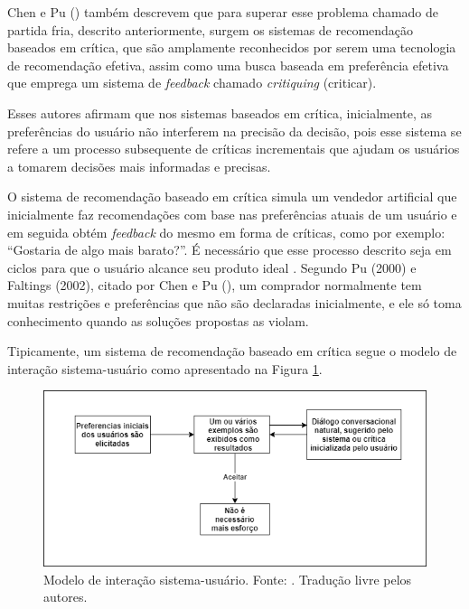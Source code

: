 Chen e Pu (\citeyear{Chen:2012}) também descrevem que para superar esse problema chamado de partida fria, descrito anteriormente, surgem os sistemas de recomendação baseados em crítica, que são amplamente reconhecidos por serem uma tecnologia de recomendação efetiva, assim como uma busca baseada em preferência efetiva que emprega um sistema de \textit{feedback} chamado \textit{critiquing} (criticar).

Esses autores afirmam que nos sistemas baseados em crítica, inicialmente, as preferências do usuário não interferem na precisão da decisão, pois esse sistema se refere a um processo subsequente de críticas incrementais que ajudam os usuários a tomarem decisões mais informadas e precisas.

O sistema de recomendação baseado em crítica simula um vendedor artificial que inicialmente faz recomendações com base nas preferências atuais de um usuário e em seguida obtém \textit{feedback} do mesmo em forma de críticas, como por exemplo: “Gostaria de algo mais barato?”. É necessário que esse processo descrito seja em ciclos para que o usuário alcance seu produto ideal \cite{Chen:2012}. Segundo Pu (2000) e Faltings (2002), citado por Chen e Pu (\citeyear{Chen:2012}), um comprador normalmente tem muitas restrições e preferências que não são declaradas inicialmente, e ele só toma conhecimento quando as soluções propostas as violam.

Tipicamente, um sistema de recomendação baseado em crítica segue o modelo de interação sistema-usuário como apresentado na Figura \ref{fig:sistema_usuario}.

\begin{figure}[H]
    \centering
    \includegraphics[scale=0.62]{figuras/referencial_teorico/sistema_usuario.png}
    \caption[Modelo de interação sistema-usuário]{Modelo de interação sistema-usuário. Fonte: \cite{Chen:2012}. Tradução livre pelos autores.}
    \label{fig:sistema_usuario}
\end{figure}

